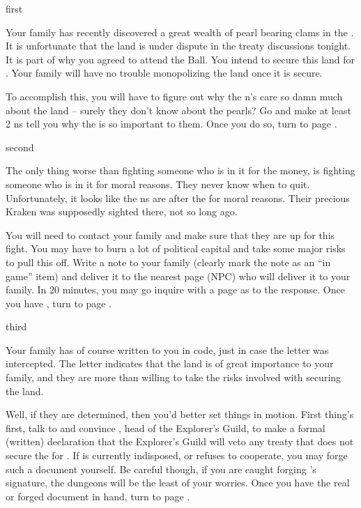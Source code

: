 \documentclass[greennotebook]{NeptuneBall}
\begin{document}

\startnotebook{\nGazaStrip{}}

\begin{page}{first}

Your family has recently discovered a great wealth of pearl bearing clams in the \pGazaStrip{}. It is unfortunate that the land is under dispute in the treaty discussions tonight. It is part of why you agreed to attend the \cExExKing{} Ball. You intend to secure this land for \pAtlantis{}. Your family will have no trouble monopolizing the land once it is secure. 

To accomplish this, you will have to figure out why the \pPacifica{}n's care so damn much about the land -- surely they don't know about the pearls? Go and make at least 2 \pPacifica{}ns tell you why the \pGazaStrip{} is so important to them. Once you do so, turn to page .

\end{page}

\begin{page}{second}

The only thing worse than fighting someone who is in it for the money, is fighting someone who is in it for moral reasons. They never know when to quit. Unfortunately, it looks like the \pPacifica{}ns are after the \pGazaStrip{} for moral reasons. Their precious Kraken was supposedly sighted there, not so long ago.

You will need to contact your family and make sure that they are up for this fight. You may have to burn a lot of political capital and take some major risks to pull this off. Write a note to your family (clearly mark the note as an ``in game'' item) and deliver it to the nearest page (NPC) who will deliver it to your family. In 20 minutes, you may go inquire with a page as to the response. Once you have \iCipherLetter{}, turn to page .

\end{page}

\begin{page}{third}

Your family has of course written to you in code, just in case the letter was intercepted. The letter indicates that the land is of great importance to your family, and they are more than willing to take the risks involved with securing the land. 

Well, if they are determined, then you'd better set things in motion. First thing's first, talk to \cPlant{} and convince \cPlant{\them}, head of the Explorer's Guild, to make a formal (written) declaration that the Explorer's Guild will veto any treaty that does not secure the \pGazaStrip{} for \pAtlantis{}. If \cPlant{\they} is currently indisposed, or refuses to cooperate, you may forge such a document yourself. Be careful though, if you are caught forging \cPlant{}'s signature, the dungeons will be the least of your worries. Once you have the real or forged document in hand, turn to page .

\end{page}
\end{document}
